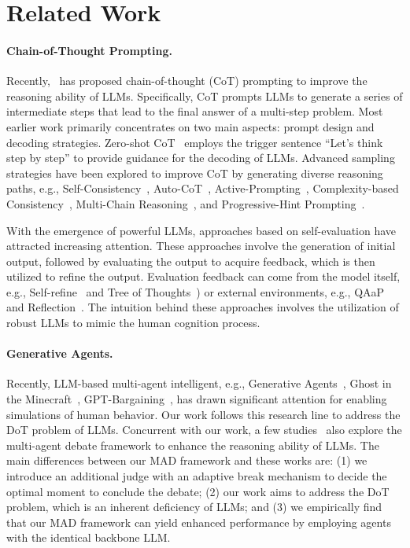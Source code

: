 \section{Related Work}

\paragraph{Chain-of-Thought Prompting.}
Recently,~\cite{wei2022CoT} has proposed chain-of-thought (CoT) prompting to improve the reasoning ability of LLMs. Specifically, CoT prompts LLMs to generate a series of intermediate steps that lead to the final answer of a multi-step problem. Most earlier work primarily concentrates on two main aspects: prompt design and decoding strategies. Zero-shot CoT~\citep{kojimalarge} employs the trigger sentence ``Let’s think step by step'' to provide guidance for the decoding of LLMs. Advanced sampling strategies have been explored to improve CoT by generating diverse reasoning paths, e.g., Self-Consistency~\citep{wang2022self}, Auto-CoT~\citep{zhang2022automatic}, Active-Prompting~\citep{diao2023active}, Complexity-based Consistency~\citep{fu2022complexity}, Multi-Chain Reasoning~\citep{yoran2023answering}, and Progressive-Hint Prompting~\citep{zheng2023progressive}. 

With the emergence of powerful LLMs, approaches based on self-evaluation have attracted increasing attention. These approaches involve the generation of initial output, followed by evaluating the output to acquire feedback, which is then utilized to refine the output. Evaluation feedback can come from the model itself, e.g., Self-refine~\citep{madaan2023selfrefine} and Tree of Thoughts~\citep{yao2023tree}) or external environments, e.g., QAaP~\citep{zhu2023question} and Reflection~\citep{shinn2023reflexion}. The intuition behind these approaches involves the utilization of robust LLMs to mimic the human cognition process. 

\paragraph{Generative Agents.}
Recently, LLM-based multi-agent intelligent, e.g., Generative Agents~\citep{park2023generative}, Ghost in the Minecraft~\citep{zhu2023ghost}, GPT-Bargaining~\citep{fu2023improving}, has drawn significant attention for enabling simulations of human behavior. Our work follows this research line to address the DoT problem of LLMs. Concurrent with our work, a few studies~\citep{xiong2023diving,du2023improving} also explore the multi-agent debate framework to  enhance the reasoning ability of LLMs. The main differences between our MAD framework and these works are: 
(1) we introduce an additional judge with an adaptive break mechanism to decide the optimal moment to conclude the debate;
(2) our work aims to address the DoT problem, which is an inherent deficiency of LLMs; 
and (3) we empirically find that our MAD framework can yield enhanced performance by employing agents with the identical backbone LLM.

